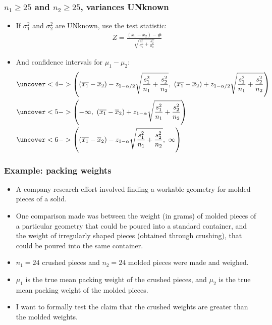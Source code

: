 \documentclass[handout]{beamer}\usepackage[]{graphicx}\usepackage[]{color}
\providecommand{\ov}[1]{\overline{#1}}
\numberwithin{equation}{section}
\begin{document}
\begin{frame}
\frametitle{$n_1 \ge 25$ and $n_2 \ge 25$, variances UNknown} \scriptsize
\begin{itemize}
\item If $\sigma^2_1$ and $\sigma_2^2$ are UNknown, use the test statistic:
\pause \begin{align*}
Z = \frac{(\ov{x}_1 - \ov{x}_2) - \#}{\sqrt{\frac{s^2_1}{n_1} + \frac{s^2_2}{n_2}}}
\end{align*}
\pause \item And confidence intervals for $\mu_1 - \mu_2$:
\begin{align*}
&\uncover<4->{\left ((\ov{x_1} - \ov{x}_2) - z_{1 - \alpha/2} \sqrt{\frac{s^2_1}{n_1} + \frac{s^2_2}{n_2}} , \ (\ov{x_1} - \ov{x}_2) + z_{1 - \alpha/2} \sqrt{\frac{s^2_1}{n_1} + \frac{s^2_2}{n_2}} \right )} \\
&\uncover<5->{\left (-\infty , \ (\ov{x_1} - \ov{x}_2) + z_{1 - \alpha} \sqrt{\frac{s^2_1}{n_1} + \frac{s^2_2}{n_2}} \right )} \\
&\uncover<6->{\left ((\ov{x_1} - \ov{x}_2) - z_{1 - \alpha} \sqrt{\frac{s^2_1}{n_1} + \frac{s^2_2}{n_2}}, \ \infty \right )}
\end{align*}
\end{itemize}
\end{frame}

\begin{frame}
\frametitle{Example: packing weights}
\begin{itemize}
\item A company research effort involved finding a workable geometry for molded pieces of a solid. 
\pause \item One comparison made was between the weight (in grams) of molded pieces of a particular geometry that could be poured into a standard container, and the weight of irregularly shaped pieces (obtained through crushing), that could be poured into the same container. 
\pause \item $n_1 = 24$ crushed pieces and $n_2 = 24$ molded pieces were made and weighed.
\pause \item $\mu_1$ is the true mean packing weight of the crushed pieces, and $\mu_2$ is the true mean packing weight of the molded pieces.
\pause \item I want to formally test the claim that the crushed weights are greater than the molded weights.
\end{itemize}
\end{frame}
\end{document}
